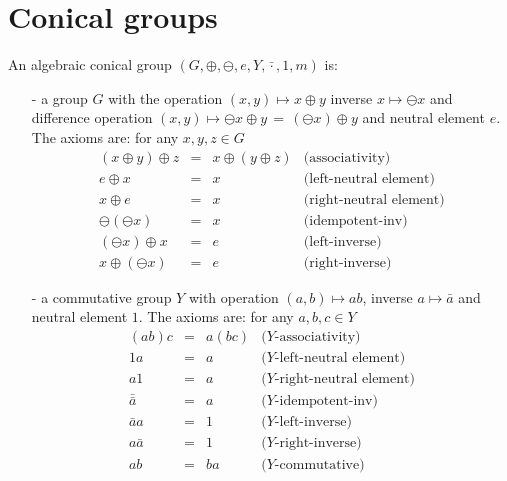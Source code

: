 \section{Conical groups}


An algebraic conical group $\displaystyle (G, \oplus, \ominus, e, Y, \bar{\cdot}, 1, m)$ is: 
\begin{enumerate}
\item[-] a group $G$  with the operation $(x,y) \mapsto x \oplus y$  inverse $x \mapsto \ominus x$ and difference operation $\displaystyle (x,y) \mapsto \ominus x \oplus y \, = \, \left( \ominus x \right) \oplus y$ and neutral element $e$. The axioms are: for any $x, y, z \in G$ 
\begin{equation}
\begin{array}{rclr}
\left(x \oplus y \right) \oplus z & = & x \oplus \left( y \oplus z \right) & \mbox{(associativity)} \\ 
 e \oplus x  & = & x  & \mbox{(left-neutral element)} \\ 
 x \oplus e  & = & x  &  \mbox{(right-neutral element)} \\
\ominus \left( \ominus x \right) & = & x  & \mbox{(idempotent-inv)} \\
 \left(\ominus x\right) \oplus x  & = & e  & \mbox{(left-inverse)} \\
 x \oplus \left(\ominus x \right)  & = & e  & \mbox{(right-inverse)}
\end{array}
\label{gpluseqs}
\end{equation}
\item[-] a commutative group $Y$ with operation $(a,b) \mapsto ab$, inverse $\displaystyle a \mapsto \bar{a}$ and neutral element $1$. The axioms are: for any $a, b, c \in Y$
\begin{equation}
\begin{array}{rclr}
\left(a b \right) c & = & a \left( b c \right) & \mbox{($Y$-associativity)} \\ 
 1 a  & = & a  & \mbox{($Y$-left-neutral element)} \\ 
 a 1  & = & a  & \mbox{($Y$-right-neutral element)} \\ 
 \bar{\bar{a}} & = & a  & \mbox{($Y$-idempotent-inv)} \\ 
 \bar{a} a  & = & 1  & \mbox{($Y$-left-inverse)} \\ 
 a \bar{a}  & = & 1  & \mbox{($Y$-right-inverse)} \\ 
 a b  & = & b a  & \mbox{($Y$-commutative)}
\end{array}
\label{ycomm}

\end{equation}
\end{enumerate}
